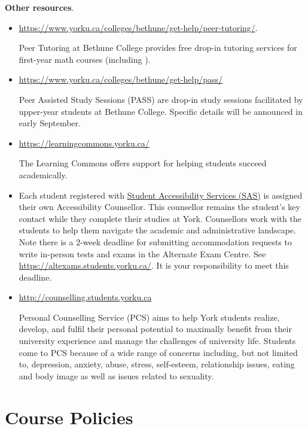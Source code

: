 \documentclass[./main.tex]{subfiles}
\begin{document}
\textbf{Other resources}. 
\begin{itemize}
  \item \url{https://www.yorku.ca/colleges/bethune/get-help/peer-tutoring/}.

    Peer Tutoring at Bethune College provides free drop-in tutoring services for first-year math courses (including \thecoursecode). 

  \item \url{https://www.yorku.ca/colleges/bethune/get-help/pass/}

    Peer Assisted Study Sessions (PASS)  are drop-in study sessions facilitated by upper-year students at Bethune College. Specific details will be announced in early September. 

  \item \url{https://learningcommons.yorku.ca/}

    The Learning Commons offers support for helping students succeed academically.

  \item Each student registered with \href{http://accessibility.students.yorku.ca/}{Student Accessibility Services (SAS)} is assigned their own Accessibility Counsellor. This counsellor remains the student's key contact while they complete their studies at York. Counsellors work with the students to help them navigate the academic and administrative landscape. Note there is a \(2\)-week deadline for submitting accommodation requests to write in-person tests and exams in the Alternate Exam Centre. See \url{https://altexams.students.yorku.ca/}. It is your responsibility to meet this deadline.

  \item \url{http://counselling.students.yorku.ca} 

    Personal Counselling Service (PCS) aims to help York students realize, develop, and fulfil their personal potential to maximally benefit from their university experience and manage the challenges of university life. Students come to PCS because of a wide range of concerns including, but not limited to, depression, anxiety, abuse, stress, self-esteem, relationship issues, eating and body image as well as issues related to sexuality.

\end{itemize}

\section*{Course Policies}
\end{document}
